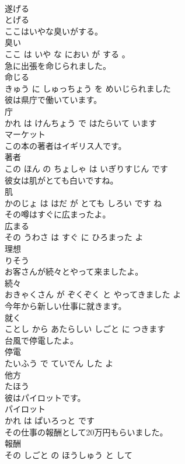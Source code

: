 \documentclass[8pt]{extreport}
\begin{document}
\begin{CJK}{UTF8}{min}
\\	遂げる	
\\	とげる		
\\	ここはいやな臭いがする。	
\\	臭い 
\\	ここ は いや な におい が する 。			
\\	急に出張を命じられました。	
\\	命じる 
\\	きゅう に しゅっちょう を めいじられました			
\\	彼は県庁で働いています。	
\\	庁 
\\	かれ は けんちょう で はたらいて います			
\\	マーケット	
\\	この本の著者はイギリス人です。	
\\	著者 
\\	この ほん の ちょしゃ は いぎりすじん です			
\\	彼女は肌がとても白いですね。	
\\	肌 
\\	かのじょ は はだ が とても しろい です ね			
\\	その噂はすぐに広まったよ。	
\\	広まる 
\\	その うわさ は すぐ に ひろまった よ			
\\	理想	
\\	りそう		
\\	お客さんが続々とやって来ましたよ。	
\\	続々 
\\	おきゃくさん が ぞくぞく と やってきました よ			
\\	今年から新しい仕事に就きます。	
\\	就く 
\\	ことし から あたらしい しごと に つきます			
\\	台風で停電したよ。	
\\	停電 
\\	たいふう で ていでん した よ			
\\	他方	
\\	たほう		
\\	彼はパイロットです。	
\\	パイロット 
\\	かれ は ぱいろっと です			
\\	その仕事の報酬として20万円もらいました。	
\\	報酬 
\\	その しごと の ほうしゅう と して 

\end{CJK}
\end{document}
